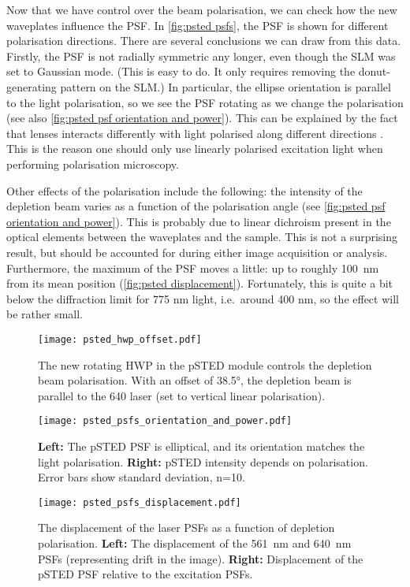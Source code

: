 Now that we have control over the beam polarisation, we can check how the new waveplates influence the PSF. In \autoref{fig:psted psfs}, the PSF is shown for different polarisation directions. There are several conclusions we can draw from this data.  Firstly, the PSF is not radially symmetric any longer, even though the SLM was set to Gaussian mode. (This is easy to do. It only requires removing the donut-generating pattern on the SLM.) In particular, the ellipse orientation is parallel to the light polarisation, so we see the PSF rotating as we change the polarisation (see also \autoref{fig:psted psf orientation and power}). This can be explained by the fact that lenses interacts differently with light polarised along different directions \cite{Egner2020}. This is the reason one should only use linearly polarised excitation light when performing polarisation microscopy.

Other effects of the polarisation include the following: the intensity of the depletion beam varies as a function of the polarisation angle (see \autoref{fig:psted psf orientation and power}). This is probably due to linear dichroism present in the optical elements between the waveplates and the sample. This is not a surprising result, but should be accounted for during either image acquisition or analysis. Furthermore, the maximum of the PSF moves a little: up to roughly 100~nm from its mean position (\autoref{fig:psted displacement}). Fortunately, this is quite a bit below the diffraction limit for 775 nm light, i.e.~around 400 nm, so the effect will be rather small.

\begin{figure}
	\centering
	\texttt{[image: psted\_hwp\_offset.pdf]}
	\caption{
		The new rotating HWP in the pSTED module controls the depletion beam polarisation. With an offset of 38.5°, the depletion beam is parallel to the 640 laser (set to vertical linear polarisation).
	}
	\label{fig:psted hwp offset}
\end{figure}

\begin{figure}
	\centering
	\texttt{[image: psted\_psfs\_orientation\_and\_power.pdf]}
	\caption{
		\textbf{Left:} The pSTED PSF is elliptical, and its orientation matches the light polarisation. \textbf{Right:} pSTED intensity depends on polarisation. Error bars show standard deviation, n=10.
	}
	\label{fig:psted psf orientation and power}
\end{figure}

\begin{figure}
	\centering
	\texttt{[image: psted\_psfs\_displacement.pdf]}
	\caption{
		The displacement of the laser PSFs as a function of depletion polarisation. \textbf{Left:} The displacement of the 561~nm and 640~nm PSFs (representing drift in the image). \textbf{Right:} Displacement of the pSTED PSF relative to the excitation PSFs.
	}
	\label{fig:psted displacement}
\end{figure}